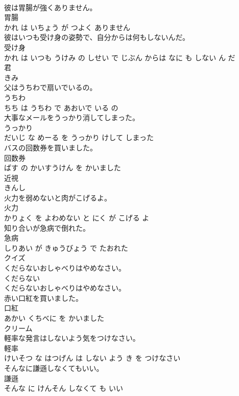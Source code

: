 \documentclass[8pt]{extreport}
\begin{document}
\begin{CJK}{UTF8}{min}
\\	彼は胃腸が強くありません。	
\\	胃腸 
\\	かれ は いちょう が つよく ありません			
\\	彼はいつも受け身の姿勢で、自分からは何もしないんだ。	
\\	受け身 
\\	かれ は いつも うけみ の しせい で じぶん からは なに も しない ん だ			
\\	君	
\\	きみ			
\\	父はうちわで扇いでいるの。	
\\	うちわ 
\\	ちち は うちわ で あおいで いる の			
\\	大事なメールをうっかり消してしまった。	
\\	うっかり 
\\	だいじ な めーる を うっかり けして しまった			
\\	バスの回数券を買いました。	
\\	回数券 
\\	ばす の かいすうけん を かいました			
\\	近視	
\\	きんし			
\\	火力を弱めないと肉がこげるよ。	
\\	火力 
\\	かりょく を よわめない と にく が こげる よ			
\\	知り合いが急病で倒れた。	
\\	急病 
\\	しりあい が きゅうびょう で たおれた			
\\	クイズ	
\\	くだらないおしゃべりはやめなさい。	
\\	くだらない 
\\	くだらないおしゃべりはやめなさい。			
\\	赤い口紅を買いました。	
\\	口紅 
\\	あかい くちべに を かいました			
\\	クリーム	
\\	軽率な発言はしないよう気をつけなさい。	
\\	軽率 
\\	けいそつ な はつげん は しない よう き を つけなさい			
\\	そんなに謙遜しなくてもいい。	
\\	謙遜 
\\	そんな に けんそん しなくて も いい			

\end{CJK}
\end{document}
